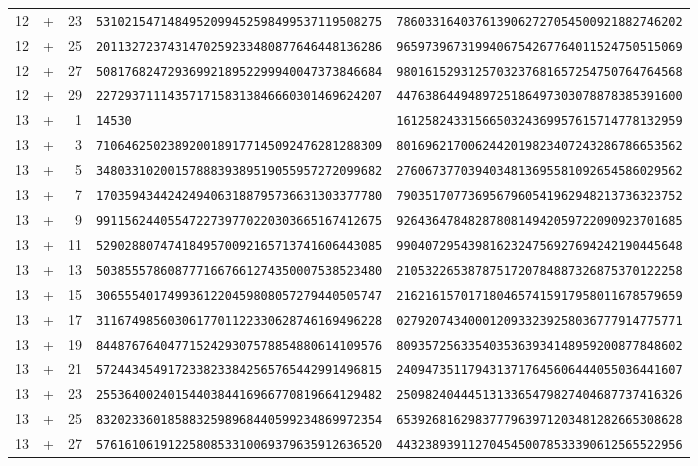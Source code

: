 \begin{longtable}{@{}rcrll@{}}
12&+&23&\texttt{5310215471484952099452598499537119508275}&\texttt{7860331640376139062727054500921882746202}\\
12&+&25&\texttt{2011327237431470259233480877646448136286}&\texttt{9659739673199406754267764011524750515069}\\
12&+&27&\texttt{5081768247293699218952299940047373846684}&\texttt{9801615293125703237681657254750764764568}\\
12&+&29&\texttt{2272937111435717158313846660301469624207}&\texttt{4476386449489725186497303078878385391600}\\
13&+&1&\texttt{14530}&\texttt{1612582433156650324369957615714778132959}\\
13&+&3&\texttt{7106462502389200189177145092476281288309}&\texttt{8016962170062442019823407243286786653562}\\
13&+&5&\texttt{3480331020015788839389519055957272099682}&\texttt{2760673770394034813695581092654586029562}\\
13&+&7&\texttt{1703594344242494063188795736631303377780}&\texttt{7903517077369567960541962948213736323752}\\
13&+&9&\texttt{9911562440554722739770220303665167412675}&\texttt{9264364784828780814942059722090923701685}\\
13&+&11&\texttt{5290288074741849570092165713741606443085}&\texttt{9904072954398162324756927694242190445648}\\
13&+&13&\texttt{5038555786087771667661274350007538523480}&\texttt{2105322653878751720784887326875370122258}\\
13&+&15&\texttt{3065554017499361220459808057279440505747}&\texttt{2162161570171804657415917958011678579659}\\
13&+&17&\texttt{3116749856030617701122330628746169496228}&\texttt{0279207434000120933239258036777914775771}\\
13&+&19&\texttt{8448767640477152429307578854880614109576}&\texttt{8093572563354035363934148959200877848602}\\
13&+&21&\texttt{5724434549172338233842565765442991496815}&\texttt{2409473511794313717645606444055036441607}\\
13&+&23&\texttt{2553640024015440384416966770819664129482}&\texttt{2509824044451313365479827404687737416326}\\
13&+&25&\texttt{8320233601858832598968440599234869972354}&\texttt{6539268162983777963971203481282665308628}\\
13&+&27&\texttt{5761610619122580853310069379635912636520}&\texttt{4432389391127045450078533390612565522956}\\

\end{longtable}
